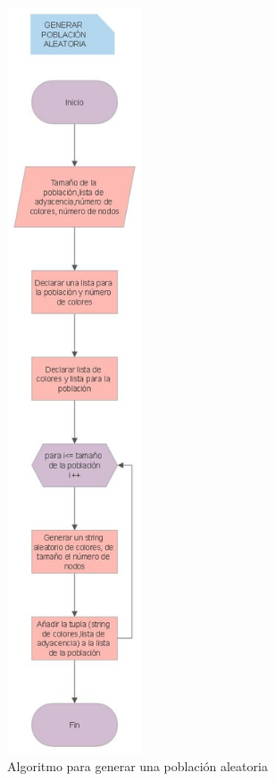\documentclass{article}
\begin{document}
\begin{figure}[H]
    \centering
    \includegraphics[width=4cm]{flujo_poblacion.jpg}
    \caption{Algoritmo para generar una población aleatoria}
    \label{fig:my_label}
\end{figure}
\newpage
\end{document}
